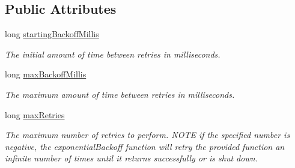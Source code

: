 \subsection*{Public Attributes}
\begin{DoxyCompactItemize}
\item 
\mbox{\label{struct_aws_1_1_iot_1_1_device_client_1_1_util_1_1_retry_1_1_exponential_retry_config_a81e7f18bc16233d1c44567928fe1fdee}} 
long \hyperlink{struct_aws_1_1_iot_1_1_device_client_1_1_util_1_1_retry_1_1_exponential_retry_config_a81e7f18bc16233d1c44567928fe1fdee}{starting\+Backoff\+Millis}
\begin{DoxyCompactList}\small\item\em The initial amount of time between retries in milliseconds. \end{DoxyCompactList}\item 
\mbox{\label{struct_aws_1_1_iot_1_1_device_client_1_1_util_1_1_retry_1_1_exponential_retry_config_abe087a52a62ebf3286ac5141cbb240cc}} 
long \hyperlink{struct_aws_1_1_iot_1_1_device_client_1_1_util_1_1_retry_1_1_exponential_retry_config_abe087a52a62ebf3286ac5141cbb240cc}{max\+Backoff\+Millis}
\begin{DoxyCompactList}\small\item\em The maximum amount of time between retries in milliseconds. \end{DoxyCompactList}\item 
\mbox{\label{struct_aws_1_1_iot_1_1_device_client_1_1_util_1_1_retry_1_1_exponential_retry_config_a4b4cb1e28c66a294d31926b66e17a3a1}} 
long \hyperlink{struct_aws_1_1_iot_1_1_device_client_1_1_util_1_1_retry_1_1_exponential_retry_config_a4b4cb1e28c66a294d31926b66e17a3a1}{max\+Retries}
\begin{DoxyCompactList}\small\item\em The maximum number of retries to perform. {\itshape N\+O\+TE} if the specified number is negative, the exponential\+Backoff function will retry the provided function an infinite number of times until it returns successfully or is shut down. \end{DoxyCompactList}\item 

\end{DoxyCompactItemize}
